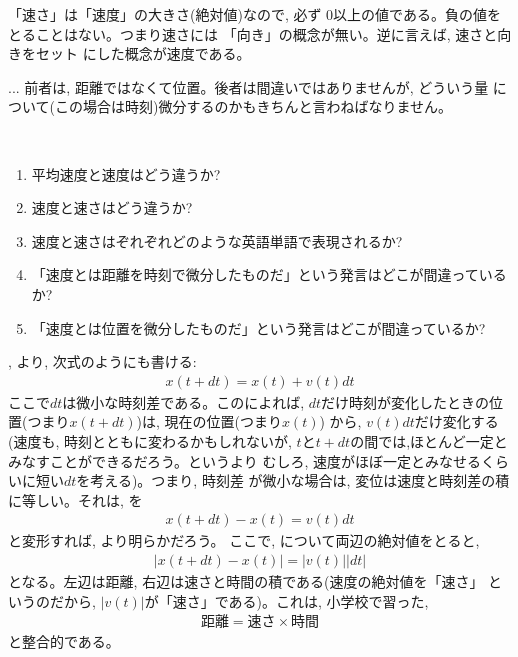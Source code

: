 「速さ」は「速度」の大きさ(絶対値)なので, 必ず
0以上の値である。負の値をとることはない。つまり速さには
「向き」の概念が無い。逆に言えば, 速さと向きをセット
にした概念が速度である。\hv

\begin{freqmiss}{\small{} ... 
前者は, 距離ではなくて位置。後者は間違いではありませんが, どういう量
について(この場合は時刻)微分するのかもきちんと言わねばなりません。}
\end{freqmiss}

\begin{q}\label{q:diff_def} 　
\begin{enumerate}
\item 平均速度と速度はどう違うか?
\item 速度と速さはどう違うか?
\item 速度と速さはぞれぞれどのような英語単語で表現されるか?
\item 「速度とは距離を時刻で微分したものだ」という発言はどこが間違っているか?
\item 「速度とは位置を微分したものだ」という発言はどこが間違っているか?
\end{enumerate}\end{q}
\hv

, より, 次式のようにも書ける:
\begin{eqnarray}
x(t+dt) = x(t) + v(t)dt\label{eq:xtdtxtvtdt}
\end{eqnarray}
ここで$dt$は微小な時刻差である。このによれば, 
$dt$だけ時刻が変化したときの位置(つまり$x(t+dt)$)は, 現在の位置(つまり$x(t)$)
から, $v(t)dt$だけ変化する(速度も, 時刻とともに変わるかもしれないが, 
$t$と$t+dt$の間では,ほとんど一定とみなすことができるだろう。というより
むしろ, 速度がほぼ一定とみなせるくらいに短い$dt$を考える)。つまり, 時刻差
が微小な場合は, 変位は速度と時刻差の積に等しい。それは, を
\begin{eqnarray}
x(t+dt)-x(t) = v(t)dt\label{eq:xtdtxtvtdt2}
\end{eqnarray}
と変形すれば, より明らかだろう。
ここで, について両辺の絶対値をとると, 
\begin{eqnarray}
|x(t+dt)-x(t)| = |v(t)||dt|\label{eq:xtdtxtvtdt3}
\end{eqnarray}
となる。左辺は距離, 右辺は速さと時間の積である(速度の絶対値を「速さ」
というのだから, $|v(t)|$が「速さ」である)。これは, 小学校で習った, 
\begin{eqnarray}\text{距離}=\text{速さ}\times\text{時間}\end{eqnarray}
と整合的である。\hv

